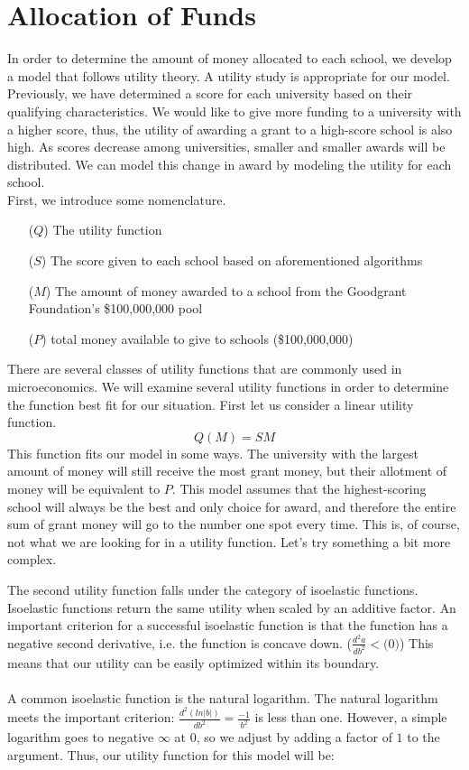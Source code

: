 \documentclass[paper.tex]{subfiles}
\begin{document}
	\section{Allocation of Funds}
	
	In order to determine the amount of money allocated to each school, we develop a model that follows utility theory. A utility study is appropriate for our model. Previously, we have determined a score for each university based on their qualifying characteristics. We would like to give more funding to a university with a higher score, thus, the utility of awarding a grant to a high-score school is also high. As scores decrease among universities, smaller and smaller awards will be distributed. We can model this change in award by modeling the utility for each school.
	\\
	
	First, we introduce some nomenclature.
	\begin{itemize}
		\item[($Q$)] The utility function
		\item[($S$)] The score given to each school based on aforementioned algorithms
		\item[($M$)] The amount of money awarded to a school from the Goodgrant Foundation's \$100,000,000 pool
		\item[($P$)] total money available to give to schools (\$100,000,000)
	\end{itemize}
	There are several classes of utility functions that are commonly used in microeconomics. We will examine several utility functions in order to determine the function best fit for our situation. First let us consider a linear utility function.
	$$ Q(M) = SM $$
	This function fits our model in some ways. The university with the largest amount of money will still receive the most grant money, but their allotment of money will be equivalent to $P$. This model assumes that the highest-scoring school will always be the best and only choice for award, and therefore the entire sum of grant money will go to the number one spot every time. This is, of course, not what we are looking for in a utility function. Let's try something a bit more complex.
	
	
	The second utility function falls under the category of isoelastic functions. Isoelastic functions return the same utility when scaled by an additive factor. \cite{norstad1999introduction}
	An important criterion for a successful isoelastic function is that the function has a negative second derivative, i.e. the function is concave down. ($ \frac{d^2a}{db^2} < ($0$) $)
	This means that our utility can be easily optimized within its boundary. 
	\\\\
	A common isoelastic function is the natural logarithm. The natural logarithm meets the important criterion: $ \frac{d^2(ln|b|)}{db^2} = \frac{-1}{b^2} $ is less than one. However, a simple logarithm goes to negative $\infty$ at $0$, so we adjust by adding a factor of $1$ to the argument. Thus, our utility function for this model will be:
	
\end{document}
